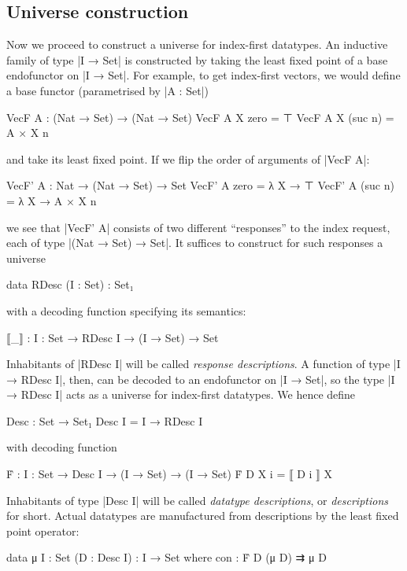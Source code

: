 
\subsection{Universe construction}
\label{sec:Desc}

Now we proceed to construct a universe for index-first datatypes.
An inductive family of type |I → Set| is constructed by taking the least fixed point of a base endofunctor on |I → Set|.
For example, to get index-first vectors, we would define a base functor (parametrised by |A : Set|)
\begin{code}
VecF A : (Nat → Set) → (Nat → Set)
VecF A X zero     =  ⊤
VecF A X (suc n)  =  A × X n
\end{code}
and take its least fixed point.
If we flip the order of arguments of |VecF A|:
\begin{code}
VecF' A : Nat → (Nat → Set) → Set
VecF' A zero     =  λ X → ⊤
VecF' A (suc n)  =  λ X → A × X n
\end{code}
we see that |VecF' A| consists of two different ``responses'' to the index request, each of type |(Nat → Set) → Set|.
It suffices to construct for such responses a universe
\begin{code}
data RDesc (I : Set) : Set₁
\end{code}
with a decoding function specifying its semantics:
\begin{code}
⟦_⟧ : {I : Set} → RDesc I → (I → Set) → Set
\end{code}
Inhabitants of |RDesc I| will be called \emph{response descriptions}.
A function of type |I → RDesc I|, then, can be decoded to an endofunctor on |I → Set|, so the type |I → RDesc I| acts as a universe for index-first datatypes.
We hence define
\begin{code}
Desc : Set → Set₁
Desc I = I → RDesc I
\end{code}
with decoding function
\begin{code}
Ḟ : {I : Set} → Desc I → (I → Set) → (I → Set)
Ḟ D X i = ⟦ D i ⟧ X
\end{code}
Inhabitants of type |Desc I| will be called \emph{datatype descriptions}, or \emph{descriptions} for short.
Actual datatypes are manufactured from descriptions by the least fixed point operator:
\begin{code}
data μ {I : Set} (D : Desc I) : I → Set where
  con : Ḟ D (μ D) ⇉ μ D
\end{code}

